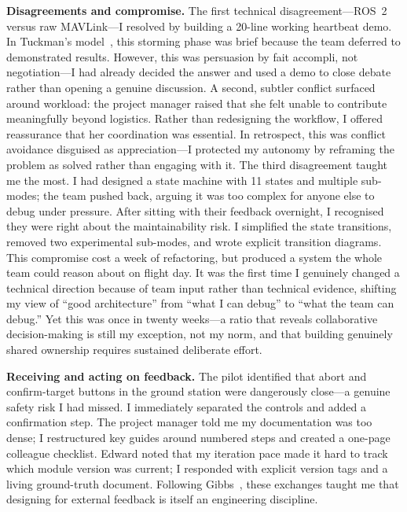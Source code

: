 \textbf{Disagreements and compromise.} The first technical disagreement---ROS~2 versus raw MAVLink---I resolved by building a 20-line working heartbeat demo. In Tuckman's model~\cite{tuckman1965}, this storming phase was brief because the team deferred to demonstrated results. However, this was persuasion by fait accompli, not negotiation---I had already decided the answer and used a demo to close debate rather than opening a genuine discussion. A second, subtler conflict surfaced around workload: the project manager raised that she felt unable to contribute meaningfully beyond logistics. Rather than redesigning the workflow, I offered reassurance that her coordination was essential. In retrospect, this was conflict avoidance disguised as appreciation---I protected my autonomy by reframing the problem as solved rather than engaging with it. The third disagreement taught me the most. I had designed a state machine with 11 states and multiple sub-modes; the team pushed back, arguing it was too complex for anyone else to debug under pressure. After sitting with their feedback overnight, I recognised they were right about the maintainability risk. I simplified the state transitions, removed two experimental sub-modes, and wrote explicit transition diagrams. This compromise cost a week of refactoring, but produced a system the whole team could reason about on flight day. It was the first time I genuinely changed a technical direction because of team input rather than technical evidence, shifting my view of ``good architecture'' from ``what I can debug'' to ``what the team can debug.'' Yet this was once in twenty weeks---a ratio that reveals collaborative decision-making is still my exception, not my norm, and that building genuinely shared ownership requires sustained deliberate effort.

\textbf{Receiving and acting on feedback.} The pilot identified that abort and confirm-target buttons in the ground station were dangerously close---a genuine safety risk I had missed. I immediately separated the controls and added a confirmation step. The project manager told me my documentation was too dense; I restructured key guides around numbered steps and created a one-page colleague checklist. Edward noted that my iteration pace made it hard to track which module version was current; I responded with explicit version tags and a living ground-truth document. Following Gibbs~\cite{gibbs1988}, these exchanges taught me that designing for external feedback is itself an engineering discipline.

